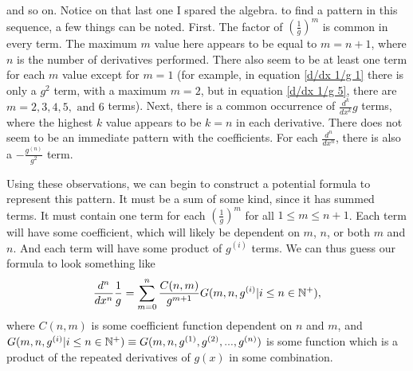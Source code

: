 and so on. Notice on that last one I spared the algebra. to find a pattern in this sequence, a few things can be noted. First. The factor of $\left(\frac{1}{g}\right)^m$ is common in every term. The maximum $m$ value here appears to be equal to $m=n+1$, where $n$ is the number of derivatives performed. There also seem to be at least one term for each $m$ value except for $m=1$ (for example, in equation \ref{d/dx 1/g 1} there is only a $g^2$ term, with a maximum $m=2$, but in equation \ref{d/dx 1/g 5}, there are $m=2,3,4,5,\text{ and }6$ terms). Next, there is a common occurrence of $\frac{d^k}{dx^k}g$ terms, where the highest $k$ value appears to be $k=n$ in each derivative. There does not seem to be an immediate pattern with the coefficients. For each $\frac{d^n}{dx^n}$, there is also a $-\frac{g^{(n)}}{g^2}$ term.

Using these observations, we can begin to construct a potential formula to represent this pattern. It must be a sum of some kind, since it has summed terms. It must contain one term for each $\left(\frac{1}{g}\right)^m$ for all $1\leq m \leq n+1$. Each term will have some coefficient, which will likely be dependent on $m$, $n$, or both $m$ and $n$. And each term will have some product of $g^{(i)}$ terms. We can thus guess our formula to look something like
\begin{align}
	\frac{d^n}{dx^n}\frac{1}{g} = \sum_{m=0}^{n}\frac{C(n,m)}{g^{m+1}}G(m, n, g^{(i)}|i \leq n \in {\mathbb N}^+),
\end{align}
where $C(n,m)$ is some coefficient function dependent on $n$ and $m$, and $G(m,n,g^{(i)}|i \leq n \in {\mathbb N}^+) \equiv G(m,n,g^{(1)}, g^{(2)},...,g^{(n)})$ is some function which is a product of the repeated derivatives of $g(x)$ in some combination. 















































